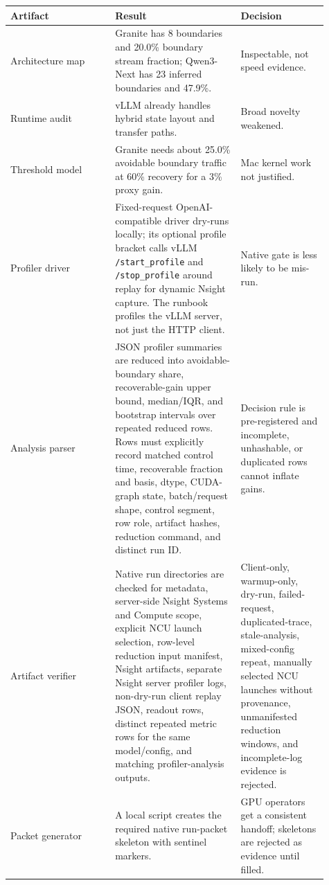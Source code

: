 \documentclass{article}
\begin{document}
\begin{table}[H]
\centering
\scriptsize
\begin{tabular}{p{0.30\linewidth}p{0.36\linewidth}p{0.25\linewidth}}
\toprule
Artifact & Result & Decision \\
\midrule
Architecture map & Granite has 8 boundaries and 20.0\% boundary stream fraction; Qwen3-Next has 23 inferred boundaries and 47.9\%. & Inspectable, not speed evidence. \\
Runtime audit & vLLM already handles hybrid state layout and transfer paths. & Broad novelty weakened. \\
Threshold model & Granite needs about 25.0\% avoidable boundary traffic at 60\% recovery for a 3\% proxy gain. & Mac kernel work not justified. \\
Profiler driver & Fixed-request OpenAI-compatible driver dry-runs locally; its optional profile bracket calls vLLM \texttt{/start\_profile} and \texttt{/stop\_profile} around replay for dynamic Nsight capture. The runbook profiles the vLLM server, not just the HTTP client. & Native gate is less likely to be mis-run. \\
Analysis parser & JSON profiler summaries are reduced into avoidable-boundary share, recoverable-gain upper bound, median/IQR, and bootstrap intervals over repeated reduced rows. Rows must explicitly record matched control time, recoverable fraction and basis, dtype, CUDA-graph state, batch/request shape, control segment, row role, artifact hashes, reduction command, and distinct run ID. & Decision rule is pre-registered and incomplete, unhashable, or duplicated rows cannot inflate gains. \\
Artifact verifier & Native run directories are checked for metadata, server-side Nsight Systems and Compute scope, explicit NCU launch selection, row-level reduction input manifest, Nsight artifacts, separate Nsight server profiler logs, non-dry-run client replay JSON, readout rows, distinct repeated metric rows for the same model/config, and matching profiler-analysis outputs. & Client-only, warmup-only, dry-run, failed-request, duplicated-trace, stale-analysis, mixed-config repeat, manually selected NCU launches without provenance, unmanifested reduction windows, and incomplete-log evidence is rejected. \\
Packet generator & A local script creates the required native run-packet skeleton with sentinel markers. & GPU operators get a consistent handoff; skeletons are rejected as evidence until filled. \\

\end{tabular}
\end{table}
\end{document}
